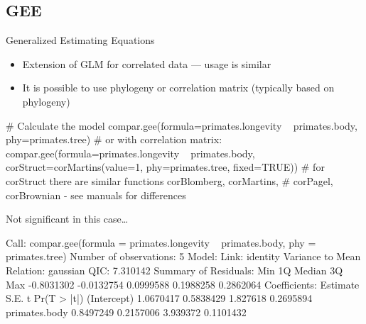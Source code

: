 \documentclass[compress, ucs, xelatex, 11pt, xcolor=svgnames, aspectratio=169,
	hyperref={
		bookmarks=true,
		unicode=true,
		colorlinks=true,
		pdftitle={Molecular data in R},
		plainpages=false,
		pdfauthor={Vojtech Zeisek},
		pdfsubject={Course about phylogeny and evolution in R},
		pdfcreator={XeLaTeX},
		pdfkeywords={R, evolution, phylogeny, molecular data},
		linkcolor=Crimson, %
		anchorcolor=Magenta, %
		citecolor=Magenta, %
		filecolor=Magenta, %
		menucolor=Magenta, %
		urlcolor=DodgerBlue, %
		pdftex},
	url={hyphens, lowtilde} %
	]{beamer}
\begin{document}
\subsection{GEE}

\begin{frame}[fragile]{Generalized Estimating Equations}
	\begin{itemize}
		\item Extension of GLM for correlated data --- usage is similar
		\item It is possible to use phylogeny or correlation matrix (typically based on phylogeny)
	\end{itemize}
	\vfil
	\begin{spluscode}
    # Calculate the model
    compar.gee(formula=primates.longevity ~ primates.body,
      phy=primates.tree)
    # or with correlation matrix:
    compar.gee(formula=primates.longevity ~ primates.body,
      corStruct=corMartins(value=1, phy=primates.tree, fixed=TRUE))
    # for corStruct there are similar functions corBlomberg, corMartins,
    # corPagel, corBrownian - see manuals for differences
	\end{spluscode}
\end{frame}

\begin{frame}[fragile]{Not significant in this case\ldots}
	\begin{spluscode}
    Call: compar.gee(formula = primates.longevity ~
      primates.body, phy = primates.tree)
    Number of observations: 5
    Model:
                         Link: identity
    Variance to Mean Relation: gaussian
    QIC: 7.310142
    Summary of Residuals:
           Min         1Q     Median         3Q        Max
    -0.8031302 -0.0132754  0.0999588  0.1988258  0.2862064
    Coefficients:
                   Estimate      S.E.        t Pr(T > |t|)
    (Intercept)   1.0670417 0.5838429 1.827618   0.2695894
    primates.body 0.8497249 0.2157006 3.939372   0.1101432
	\end{spluscode}
\end{frame}

%
%
\end{document}
